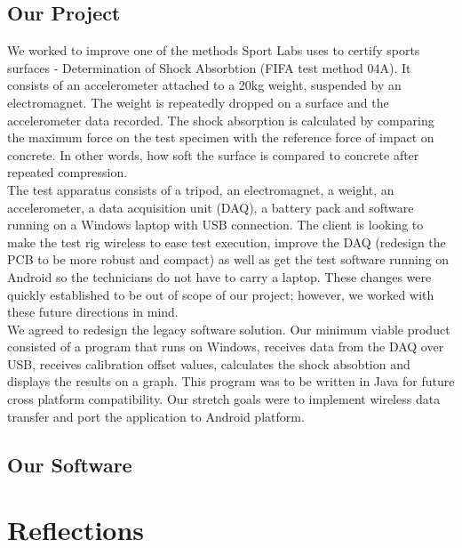 \documentclass{l3proj}
\begin{document}
\subsection{Our Project}
We worked to improve one of the methods Sport Labs uses to certify sports surfaces - Determination of Shock Absorbtion (FIFA test method 04A). It consists of an accelerometer attached to a 20kg weight, suspended by an electromagnet. The weight is repeatedly dropped on a surface and the accelerometer data recorded. The shock absorption is calculated by comparing the maximum force on the test specimen with the reference force of impact on concrete\cite{fifa}. In other words, how soft the surface is compared to concrete after repeated compression. \\
The test apparatus consists of a tripod, an electromagnet, a weight, an accelerometer, a data acquisition unit (DAQ), a battery pack and software running on a Windows laptop with USB connection. The client is looking to make the test rig wireless to ease test execution, improve the DAQ (redesign the PCB to be more robust and compact) as well as get the test software running on Android so the technicians do not have to carry a laptop. These changes were quickly established to be out of scope of our project; however, we worked with these future directions in mind. \\
We agreed to redesign the legacy software solution. Our minimum viable product consisted of a program that runs on Windows, receives data from the DAQ over USB, receives calibration offset values, calculates the shock absobtion and displays the results on a graph. This program was to be written in Java for future cross platform compatibility. Our stretch goals were to implement wireless data transfer and port the application to Android platform.
\subsection{Our Software}

\section{Reflections}
\end{document}
